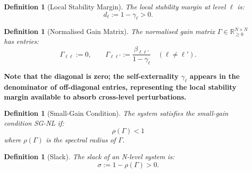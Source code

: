 \documentclass[12pt]{article}
\newtheorem{definition}[theorem]{Definition}
\newcommand{\R}{\mathbb{R}}
\newcommand{\added}[1]{\textbf{#1}}
\begin{document}
\begin{definition}[Local Stability Margin]
The \emph{local stability margin} at level $\ell$ is:
\[
d_\ell := 1 - \gamma_\ell > 0.
\]
\end{definition}

\begin{definition}[Normalised Gain Matrix]
\label{def:gain-matrix}
The \emph{normalised gain matrix} $\Gamma \in \R^{N \times N}_{\geq 0}$ has entries:
\[
\Gamma_{\ell\ell} := 0, \qquad \Gamma_{\ell\ell'} := \frac{\beta_{\ell\ell'}}{1 - \gamma_\ell} \quad (\ell \neq \ell').
\]
\end{definition}

\added{\textbf{Note that the diagonal is zero; the self-externality $\gamma_\ell$ appears in the denominator of off-diagonal entries, representing the local stability margin available to absorb cross-level perturbations.}}

\begin{definition}[Small-Gain Condition]
\label{def:small-gain}
The system satisfies the \emph{small-gain condition} SG-NL if:
\[
\rho(\Gamma) < 1
\]
where $\rho(\Gamma)$ is the spectral radius of $\Gamma$.
\end{definition}

\begin{definition}[Slack]
The \emph{slack} of an N-level system is:
\[
\sigma := 1 - \rho(\Gamma) > 0.
\]
\end{definition}
\end{document}
